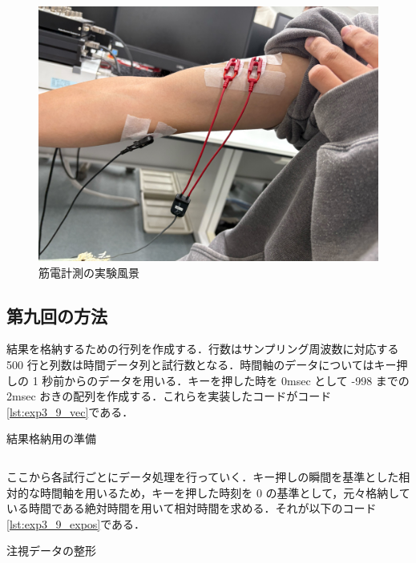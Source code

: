 \documentclass[dvipdfmx, titlepage, t]{jsarticle}
\begin{document}
\begin{figure}[H]
\begin{minipage}[b]{0.32\linewidth}
        \includegraphics[width=\linewidth]{figure/IMG_6942.jpg} %
    \end{minipage}
    \caption{筋電計測の実験風景} %
    \label{fig:musle} %
\end{figure}    

    \subsection{第九回の方法}
    結果を格納するための行列を作成する．行数はサンプリング周波数に対応する 500 行と列数は時間データ列と試行数となる．時間軸のデータについてはキー押しの 1 秒前からのデータを用いる．キーを押した時を 0msec として -998 までの 2msec おきの配列を作成する．これらを実装したコードがコード\ref{lst:exp3_9_vec}である．
    
    \begin{program}[H]
        \caption{結果格納用の準備}
        \inputminted[linenos,
        firstline=1,
        lastline=11,
        frame=lines,
        fontsize = \small]{matlab}{code/Exp3_9_Matlab.m}
        \label{lst:exp3_9_vec}
    \end{program}

    ここから各試行ごとにデータ処理を行っていく．キー押しの瞬間を基準とした相対的な時間軸を用いるため，キーを押した時刻を 0 の基準として，元々格納している時間である絶対時間を用いて相対時間を求める．それが以下のコード\ref{lst:exp3_9_expos}である．
    \begin{program}[H]
        \caption{注視データの整形}
        \inputminted[linenos,
        firstline=18,
        lastline=27,
        frame=lines,
        fontsize = \small]{matlab}{code/Exp3_9_Matlab.m}
        \label{lst:exp3_9_expos}
    \end{program}
\end{document}

